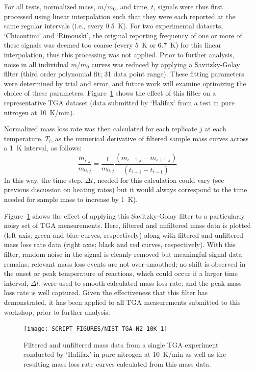 \documentclass{book}
\begin{document}
For all tests, normalized mass, $m/m_0$, and time, $t$, signals were thus first processed using linear interpolation such that they were each reported at the same regular intervals (i.e., every 0.5~K). For two experimental datasets, ‘Chicoutimi’ and ‘Rimouski', the original reporting frequency of one or more of these signals was deemed too coarse (every 5~K or 6.7~K) for this linear interpolation, thus this processing was not applied.
Prior to further analysis, noise in all individual $m/m_0$ curves was reduced by applying a Savitzky-Golay filter (third order polynomial fit; 31 data point range). These fitting parameters were determined by trial and error, and future work will examine optimizing the choice of these parameters. Figure~\ref{Fig:TGA_N2_10K_1} shows the effect of this filter on a representative TGA dataset (data submitted by ‘Halifax’ from a test in pure nitrogen at 10~K/min).

Normalized mass loss rate was then calculated for each replicate $j$ at each temperature, $T_i$, as the numerical derivative of filtered sample mass curves across a 1~K interval, as follows:
\begin{equation}
   \frac{\dot{m}_{i,j}}{m_{0,j}} = \frac{1}{m_{0,j}}\frac{\left(m_{i-1,j}-m_{i+1,j}\right)}{\left(t_{i+1}-t_{i-1}\right)}
\end{equation}
In this way, the time step, $\Delta t$, needed for this calculation could vary (see previous discussion on heating rates) but it would always correspond to the time needed for sample mass to increase by 1~K).

Figure~\ref{Fig:TGA_N2_10K_1} shows the effect of applying this Savitzky-Golay filter to a particularly noisy set of TGA measurements. Here, filtered and unfiltered mass data is plotted (left axis; green and blue curves, respectively) along with filtered and unfiltered mass loss rate data (right axis; black and red curves, respectively). With this filter, random noise in the signal is cleanly removed but meaningful signal data remains; relevant mass loss events are not over-smoothed; no shift is observed in the onset or peak temperature of reactions, which could occur if a larger time interval, $\Delta t$, were used to smooth calculated mass loss rate; and the peak mass loss rate is well captured. Given the effectiveness that this filter has demonstrated, it has been applied to all TGA measurements submitted to this workshop, prior to further analysis.

\begin{figure}[h!]
  \centering
  \texttt{[image: SCRIPT\_FIGURES/NIST\_TGA\_N2\_10K\_1]}
  \caption{Filtered and unfiltered mass data from a single TGA experiment conducted by ‘Halifax’ in pure nitrogen at 10~K/min as well as the resulting mass loss rate curves calculated from this mass data.}
  \label{Fig:TGA_N2_10K_1}
\end{figure}
\end{document}
